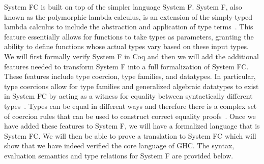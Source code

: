 \documentclass{sig-alternate}
\begin{document}
System FC is built on top of the simpler language System F. System F, also known as the polymorphic lambda calculus, is an extension of the simply-typed lambda calculus to include the abstraction and application of type terms~\cite{Pierce:TAPL}. This feature essentially allows for functions to take types as parameters, granting the ability to define functions whose actual types vary based on these input types. We will first formally verify System F in Coq and then we will add the additional features needed to transform System F into a full formalization of System FC. These features include type coercion, type families, and datatypes. In particular, type coercions allow for type families and generalized algebraic datatypes to exist in System FC by acting as a witness for equality between syntactically different types~\cite{DBLP:conf/rta/VytiniotisJ13}. Types can be equal in different ways and therefore there is a complex set of coercion rules that can be used to construct correct equality proofs~\cite{Breitner:2014:SZC:2628136.2628141}.  Once we have added these features to System F, we will have a formalized language that is System FC. We will then be able to prove a translation to System FC which will show that we have indeed verified the core language of GHC. The syntax, evaluation semantics and type relations for System F are provided below.\vspace{1cm}\\
\newcommand\mybox[2][]{#2}%
\\
\end{document}
